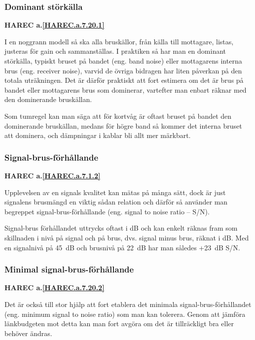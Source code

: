 \subsubsection{Dominant störkälla}
\textbf{HAREC a.\ref{HAREC.a.7.20.1}\label{myHAREC.a.7.20.1}}

I en noggrann modell så ska alla bruskällor, från källa till mottagare,
listas, justeras för gain och sammanställas.
I praktiken så har man en dominant störkälla, typiskt bruset på bandet
(eng. band noise) eller mottagarens interna brus (eng. receiver noise),
varvid de övriga bidragen har liten påverkan på den totala uträkningen.
Det är därför praktiskt att fort estimera om det är brus på bandet eller
mottagarens brus som dominerar, vartefter man enbart räknar med den
dominerande bruskällan.

Som tumregel kan man säga att för kortvåg är oftast bruset på bandet
den dominerande bruskällan, medans för högre band så kommer det interna
bruset att dominera, och dämpningar i kablar bli allt mer märkbart.

\subsubsection{Signal-brus-förhållande}
\textbf{HAREC a.\ref{HAREC.a.7.1.2}\label{myHAREC.a.7.1.2}}

Upplevelsen av en signals kvalitet kan mätas på många sätt, dock är just
signalens brusmängd en viktig sådan relation och därför så använder man
begreppet signal-brus-förhållande (eng. signal to noise ratio -- S/N).

Signal-brus förhållandet uttrycks oftast i dB och kan enkelt räknas fram
som skillnaden i nivå på signal och på brus, dvs. signal minus brus, räknat i
dB. Med en signalnivå på 45~dB och brusnivå på 22~dB har man således +23~dB
S/N.

\subsubsection{Minimal signal-brus-förhållande}
\textbf{HAREC a.\ref{HAREC.a.7.20.2}\label{myHAREC.a.7.20.2}}

Det är också till stor hjälp att fort etablera det minimala
signal-brus-förhållandet (eng. minimum signal to noise ratio)
som man kan tolerera.
Genom att jämföra länkbudgeten mot detta kan man fort avgöra om det är
tillräckligt bra eller behöver ändras.

